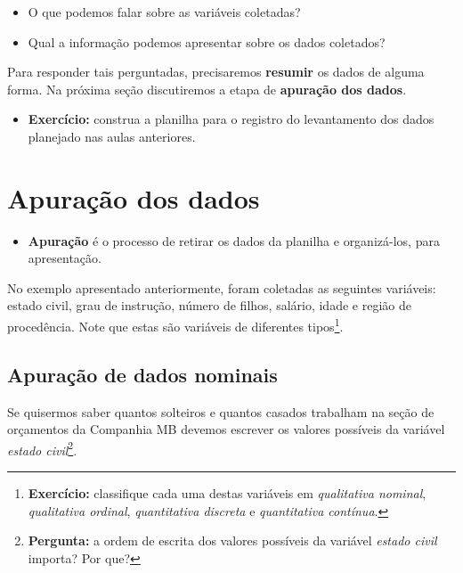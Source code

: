 \documentclass[nofonts,]{tufte-handout}
\providecommand{\tightlist}{%
  \setlength{\itemsep}{0pt}\setlength{\parskip}{0pt}}
\begin{document}
\begin{itemize}
\tightlist
\item
  O que podemos falar sobre as variáveis coletadas?
\item
  Qual a informação podemos apresentar sobre os dados coletados?
\end{itemize}

Para responder tais perguntadas, precisaremos \textbf{resumir} os dados
de alguma forma. Na próxima seção discutiremos a etapa de
\textbf{apuração dos dados}.

\begin{itemize}
\tightlist
\item
  \textbf{Exercício:} construa a planilha para o registro do
  levantamento dos dados planejado nas aulas anteriores.
\end{itemize}

\hypertarget{apurauxe7uxe3o-dos-dados}{%
\section{Apuração dos dados}\label{apurauxe7uxe3o-dos-dados}}

\begin{itemize}
\tightlist
\item
  \textbf{Apuração} é o processo de retirar os dados da planilha e
  organizá-los, para apresentação.
\end{itemize}

No exemplo apresentado anteriormente, foram coletadas as seguintes
variáveis: estado civil, grau de instrução, número de filhos, salário,
idade e região de procedência. Note que estas são variáveis de
diferentes tipos\footnote{\textbf{Exercício:} classifique cada uma
  destas variáveis em \emph{qualitativa nominal}, \emph{qualitativa
  ordinal}, \emph{quantitativa discreta} e \emph{quantitativa contínua}.}.

\hypertarget{apurauxe7uxe3o-de-dados-nominais}{%
\subsection{Apuração de dados
nominais}\label{apurauxe7uxe3o-de-dados-nominais}}

Se quisermos saber quantos solteiros e quantos casados trabalham na
seção de orçamentos da Companhia MB devemos escrever os valores
possíveis da variável \emph{estado civil}\footnote{\textbf{Pergunta:} a
  ordem de escrita dos valores possíveis da variável \emph{estado civil}
  importa? Por que?}.
\end{document}
